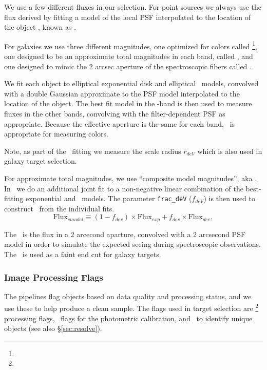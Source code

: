 \documentclass[12pt,preprint]{aastex}
\begin{document}
We use a few different fluxes in our selection. For point sources we always use
the flux derived by fitting a model of the local PSF interpolated to the
location of the object \citep{LuptonADASS01,Sheldon04}, known as \psfmag.  


For galaxies we use three different magnitudes, one optimized for colors called
\modelmag\footnote{\DRatemags}, one designed to be an approximate total
magnitudes in each band, called \cmodelmag, and one designed to mimic
the 2 arcsec aperture of the spectroscopic fibers called \fibertwomag.  

We fit each object to elliptical exponential disk and elliptical \devauc\
models, convolved with a double Gaussian approximate to the PSF model
interpolated to the location of the object.  The best fit model in the
\rmag-band is then used to measure fluxes in the other bands, convolving with
the filter-dependent PSF as appropriate.  Because the effective aperture is the
same for each band, \modelmag\ is appropriate for measuring colors.  

Note, as part of the \devauc\ fitting we measure the scale radius $r_{deV}$
which is also used in galaxy target selection.

For approximate total magnitudes, we use ``composite model magnitudes'', aka
\cmodelmag.  In \photo\ we do an additional joint fit to a non-negative linear
combination of the best-fitting exponential and \devauc\ models.  The parameter
\texttt{frac\_deV} ($f_{deV}$) is then used to construct \cmodelmag\ from the
individual fits.
\begin{equation}
\textrm{Flux}_{cmodel} \equiv (1-f_{dev})\times \textrm{Flux}_{exp} + f_{dev} \times \textrm{Flux}_{dev},
\end{equation}

The \fibertwomag\ is the flux in a 2 arcecond aparture, convolved with a 2
arcsecond PSF model in order to simulate the expected seeing during
spectroscopic observations.  The \fibertwomag\ is used as a faint end cut for
galaxy targets.

\subsubsection{Image Processing Flags} \label{sec:flags}

The pipelines flag objects based on data quality and processing status, and we
use these to help produce a clean sample.  The flags used in target selection
are \objflags\footnote{\DRateflags} processing flags, \calibflags\ flags for
the photometric calibration, and \resolveflags\ to identify unique objects (see
also \S \ref{sec:resolve}).
\end{document}
